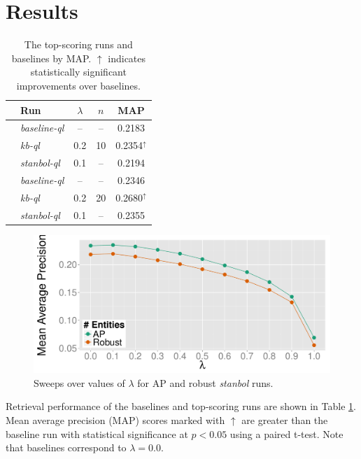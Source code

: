 \documentclass{sig-alternate}
\begin{document}
\section{Results}\label{section.results}

\begin{table}[htbp]
\centering
\begin{tabular}{|c|l|c|c|c|} \hline
& {\bf Run} & {\bf $\lambda$} & {\bf $n$} & {\bf MAP} \\ \hline
\rule{0pt}{2.5ex} \multirow{3}{*}{Robust} & {\it baseline-ql} & -- & -- & 0.2183 \\ \cline{2-5}
\rule{0pt}{2.5ex} & {\it kb-ql} & 0.2 & 10 & 0.2354$^{\uparrow}$ \\ \cline{2-5}
\rule{0pt}{2.5ex} & {\it stanbol-ql} & 0.1 & -- & 0.2194 \\ \hline
\rule{0pt}{2.5ex} \multirow{3}{*}{AP} & {\it baseline-ql} & -- & -- & 0.2346 \\ \cline{2-5}
\rule{0pt}{2.5ex} & {\it kb-ql} & 0.2 & 20 & 0.2680$^{\uparrow}$ \\ \cline{2-5}
\rule{0pt}{2.5ex} & {\it stanbol-ql} & 0.1 & -- & 0.2355 \\ \hline
\end{tabular}
\caption{The top-scoring runs and baselines by MAP. $\uparrow$ indicates statistically significant improvements over baselines.}
\label{table.performance}
\end{table}

\begin{figure}[!htb]
\centering
\includegraphics[width=.85\columnwidth]{figures/sweep-stanbol.pdf}
\caption{Sweeps over values of $\lambda$ for AP and robust \textit{stanbol} runs.}
\label{figure.sweeps-stanbol}
\end{figure}

Retrieval performance of the baselines and top-scoring runs are shown in Table \ref{table.performance}. Mean average precision (MAP) scores marked with $\uparrow$ are greater than the baseline run with statistical significance at $p < 0.05$ using a paired t-test. Note that baselines correspond to $\lambda = 0.0$. 
\end{document}
